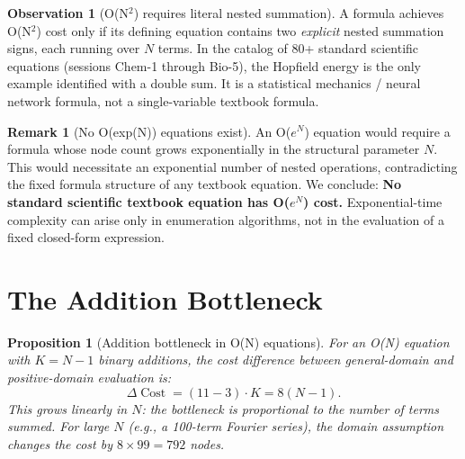 \documentclass[12pt,a4paper]{article}
\newtheorem{proposition}[theorem]{Proposition}
\theoremstyle{definition}
\newtheorem{remark}[theorem]{Remark}
\newtheorem{observation}[theorem]{Observation}
\newcommand{\Cost}{\operatorname{Cost}}
\begin{document}
\begin{observation}[O(N$^2$) requires literal nested summation]
\label{obs:ON2_condition}
A formula achieves O(N$^2$) cost only if its defining equation contains
two \emph{explicit} nested summation signs, each running over $N$ terms.
In the catalog of 80+ standard scientific equations (sessions Chem-1
through Bio-5), the Hopfield energy is the only example identified with
a double sum.  It is a statistical mechanics / neural network formula,
not a single-variable textbook formula.
\end{observation}

\begin{remark}[No O(exp(N)) equations exist]
An O($e^N$) equation would require a formula whose node count grows
exponentially in the structural parameter $N$.  This would necessitate
an exponential number of nested operations, contradicting the fixed
formula structure of any textbook equation.  We conclude:
\textbf{No standard scientific textbook equation has O($e^N$) cost.}
Exponential-time complexity can arise only in enumeration algorithms,
not in the evaluation of a fixed closed-form expression.
\end{remark}

\section{The Addition Bottleneck}
\label{sec:add_bottleneck}

\begin{proposition}[Addition bottleneck in O(N) equations]
\label{prop:add_bottleneck}
For an O(N) equation with $K = N-1$ binary additions, the cost
difference between general-domain and positive-domain evaluation is:
\[
  \Delta\Cost = (11 - 3) \cdot K = 8(N-1).
\]
This grows linearly in $N$: the bottleneck is proportional to the
number of terms summed.  For large $N$ (e.g., a 100-term Fourier
series), the domain assumption changes the cost by $8 \times 99 = 792$
nodes.
\end{proposition}
\end{document}
